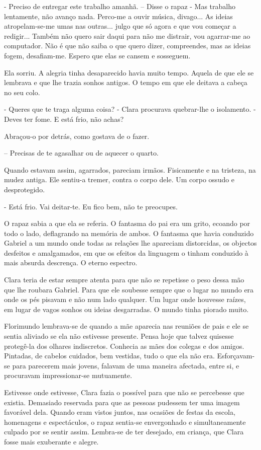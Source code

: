 - Preciso de entregar este trabalho amanhã. -- Disse o rapaz - Mas
trabalho lentamente, não avanço nada. Perco-me a ouvir música, divago...
As ideias atropelam-se-me umas nas outras... julgo que só agora e que
vou começar a redigir... Também não quero sair daqui para não me
distrair, vou agarrar-me ao computador. Não é que não saiba o que quero
dizer, compreendes, mas as ideias fogem, desafiam-me. Espero que elas se
cansem e sosseguem.

Ela sorriu. A alegria tinha desaparecido havia muito tempo. Aquela de
que ele se lembrava e que lhe trazia sonhos antigos. O tempo em que ele
deitava a cabeça no seu colo.

- Queres que te traga alguma coisa? - Clara procurava quebrar-lhe o
isolamento. - Deves ter fome. E está frio, não achas?

Abraçou-o por detrás, como gostava de o fazer.

-- Precisas de te agasalhar ou de aquecer o quarto.

Quando estavam assim, agarrados, pareciam irmãos. Fisicamente e na
tristeza, na mudez antiga. Ele sentiu-a tremer, contra o corpo dele. Um
corpo ossudo e desprotegido.

- Está frio. Vai deitar-te. Eu fico bem, não te preocupes.

O rapaz sabia a que ela se referia. O fantasma do pai era um grito,
ecoando por todo o lado, deflagrando na memória de ambos. O fantasma que
havia conduzido Gabriel a um mundo onde todas as relações lhe apareciam
distorcidas, os objectos desfeitos e amalgamados, em que os efeitos da
linguagem o tinham conduzido à mais absurda descrença. O eterno
espectro.

Clara teria de estar sempre atenta para que não se repetisse o peso
dessa mão que lhe roubara Gabriel. Para que ele soubesse sempre que o
lugar no mundo era onde os pés pisavam e não num lado qualquer. Um lugar
onde houvesse raízes, em lugar de vagos sonhos ou ideias desgarradas. O
mundo tinha piorado muito.

Florimundo lembrava-se de quando a mãe aparecia nas reuniões de pais e
ele se sentia aliviado se ela não estivesse presente. Pensa hoje que
talvez quisesse protegê-la dos olhares indiscretos. Conhecia as mães dos
colegas e dos amigos. Pintadas, de cabelos cuidados, bem vestidas, tudo
o que ela não era. Esforçavam-se para parecerem mais jovens, falavam de
uma maneira afectada, entre si, e procuravam impressionar-se mutuamente.

Estivesse onde estivesse, Clara fazia o possível para que não se
percebesse que existia. Demasiado reservada para que as pessoas pudessem
ter uma imagem favorável dela. Quando eram vistos juntos, nas ocasiões
de festas da escola, homenagens e espectáculos, o rapaz sentia-se
envergonhado e simultaneamente culpado por se sentir assim. Lembra-se de
ter desejado, em criança, que Clara fosse mais exuberante e alegre.

